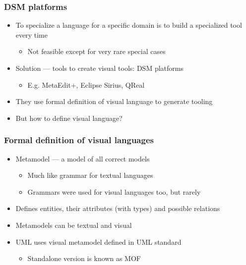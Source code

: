 \documentclass{slides-style}
\begin{document}
    \begin{frame}
        \frametitle{DSM platforms}
        \begin{itemize}
            \item To specialize a language for a specific domain is to build a specialized tool every time
            \begin{itemize}
                \item Not feasible except for very rare special cases
            \end{itemize}
            \item Solution --- tools to create visual tools: DSM platforms
            \begin{itemize}
                \item E.g. MetaEdit+, Eclipse Sirius, QReal
            \end{itemize}
            \item They use formal definition of visual language to generate tooling
            \item But how to define visual language?
        \end{itemize}
    \end{frame}

    \begin{frame}
        \frametitle{Formal definition of visual languages}
        \begin{itemize}
            \item Metamodel --- a model of all correct models
            \begin{itemize}
                \item Much like grammar for textual languages
                \item Grammars were used for visual languages too, but rarely
            \end{itemize}
            \item Defines entities, their attributes (with types) and possible relations
            \item Metamodels can be textual and visual
            \item UML uses visual metamodel defined in UML standard
            \begin{itemize}
                \item Standalone version is known as MOF
            \end{itemize}
        \end{itemize}
    \end{frame}
\end{document}
